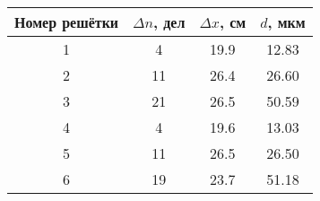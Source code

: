 \begin{tabular}{cccc}
\toprule
Номер решётки & $\Delta n$, дел & $\Delta x$, см & $d$, мкм \\
\midrule
1 & 4  & 19.9 & 12.83 \\
2 & 11 & 26.4 & 26.60 \\
3 & 21 & 26.5 & 50.59 \\
4 & 4  & 19.6 & 13.03 \\
5 & 11 & 26.5 & 26.50 \\
6 & 19 & 23.7 & 51.18 \\
\bottomrule
\end{tabular}
